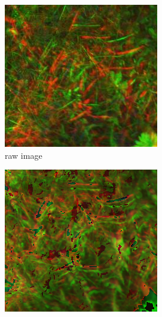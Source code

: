 \documentclass[a4paper,twoside]{article}
\begin{document}
	\begin{figure}[ht]
		\centering
		
		\begin{subfigure}[b]{0.2\textwidth}
			\centering
			\includegraphics[width=\linewidth]{../figures/results-uncorrected}
			\caption{raw image}
			\label{fig:merged-correction-uncorrected}
		\end{subfigure}
		\begin{subfigure}[b]{0.2\textwidth}
			\centering
			\includegraphics[width=\linewidth]{../figures/results-manufacturer}

\end{subfigure}
\end{figure}
\end{document}

